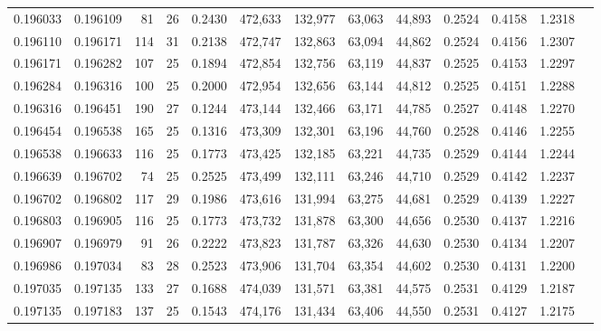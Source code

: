 \begin{tabular}{rrrrrrrrrrrrr}
0.196033 & 0.196109 &  81 &  26 &                                     0.2430 & 472,633 & 132,977 &  63,063 &  44,893 & 0.2524 & 0.4158 & 1.2318 \\
0.196110 & 0.196171 & 114 &  31 &                                     0.2138 & 472,747 & 132,863 &  63,094 &  44,862 & 0.2524 & 0.4156 & 1.2307 \\
0.196171 & 0.196282 & 107 &  25 &                                     0.1894 & 472,854 & 132,756 &  63,119 &  44,837 & 0.2525 & 0.4153 & 1.2297 \\
0.196284 & 0.196316 & 100 &  25 &                                     0.2000 & 472,954 & 132,656 &  63,144 &  44,812 & 0.2525 & 0.4151 & 1.2288 \\
0.196316 & 0.196451 & 190 &  27 &                                     0.1244 & 473,144 & 132,466 &  63,171 &  44,785 & 0.2527 & 0.4148 & 1.2270 \\
0.196454 & 0.196538 & 165 &  25 &                                     0.1316 & 473,309 & 132,301 &  63,196 &  44,760 & 0.2528 & 0.4146 & 1.2255 \\
0.196538 & 0.196633 & 116 &  25 &                                     0.1773 & 473,425 & 132,185 &  63,221 &  44,735 & 0.2529 & 0.4144 & 1.2244 \\
0.196639 & 0.196702 &  74 &  25 &                                     0.2525 & 473,499 & 132,111 &  63,246 &  44,710 & 0.2529 & 0.4142 & 1.2237 \\
0.196702 & 0.196802 & 117 &  29 &                                     0.1986 & 473,616 & 131,994 &  63,275 &  44,681 & 0.2529 & 0.4139 & 1.2227 \\
0.196803 & 0.196905 & 116 &  25 &                                     0.1773 & 473,732 & 131,878 &  63,300 &  44,656 & 0.2530 & 0.4137 & 1.2216 \\
0.196907 & 0.196979 &  91 &  26 &                                     0.2222 & 473,823 & 131,787 &  63,326 &  44,630 & 0.2530 & 0.4134 & 1.2207 \\
0.196986 & 0.197034 &  83 &  28 &                                     0.2523 & 473,906 & 131,704 &  63,354 &  44,602 & 0.2530 & 0.4131 & 1.2200 \\
0.197035 & 0.197135 & 133 &  27 &                                     0.1688 & 474,039 & 131,571 &  63,381 &  44,575 & 0.2531 & 0.4129 & 1.2187 \\
0.197135 & 0.197183 & 137 &  25 &                                     0.1543 & 474,176 & 131,434 &  63,406 &  44,550 & 0.2531 & 0.4127 & 1.2175 \\

\end{tabular}

